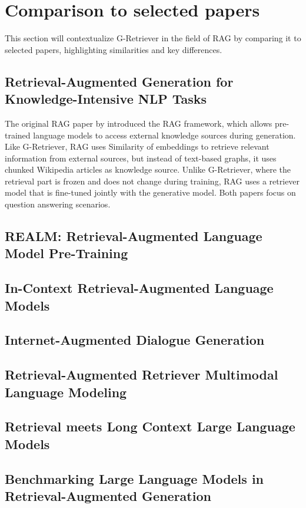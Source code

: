\section{Comparison to selected papers}

This section will contextualize G-Retriever in the field of RAG by comparing it to selected papers, highlighting similarities and key differences.

\subsection{Retrieval-Augmented Generation for    Knowledge-Intensive NLP Tasks}

The original RAG paper by \citet{rag} introduced the RAG framework, which allows pre-trained language models to access external knowledge sources during generation.
Like G-Retriever, RAG uses Similarity of embeddings to retrieve relevant information from external sources, but instead of text-based graphs, it uses chunked Wikipedia articles as knowledge source.
Unlike G-Retriever, where the retrieval part is frozen and does not change during training, RAG uses a retriever model that is fine-tuned jointly with the generative model.
Both papers focus on question answering scenarios.

\subsection{REALM: Retrieval-Augmented Language Model Pre-Training}

\subsection{In-Context Retrieval-Augmented Language Models}

\subsection{Internet-Augmented Dialogue Generation}

\subsection{Retrieval-Augmented Retriever Multimodal Language Modeling}

\subsection{Retrieval meets Long Context Large Language Models}

\subsection{Benchmarking Large Language Models in Retrieval-Augmented Generation}